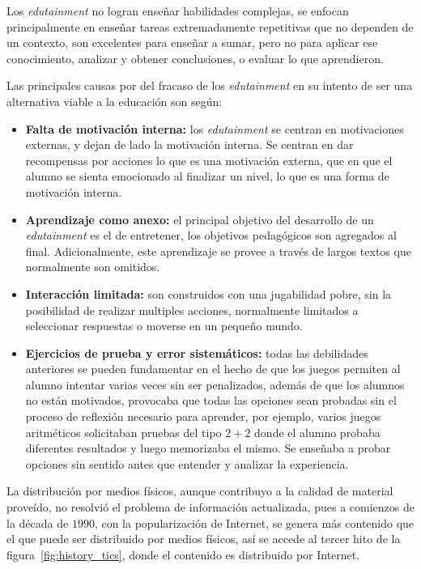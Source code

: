 Los \emph{edutainment} no logran enseñar habilidades complejas, se enfocan
principalmente en enseñar tareas extremadamente repetitivas que no dependen de
un contexto\cite{charsky:2010,egenfeldt2007third,bruckman1999can}, son
excelentes para enseñar a sumar, pero no para aplicar ese conocimiento, analizar
y obtener conclusiones, o evaluar lo que aprendieron.

Las principales causas por del fracaso de los \emph{edutainment} en su intento
de ser una alternativa viable a la educación son según\cite{egenfeldt2007third}: 

\begin{itemize}

\item \textbf{Falta de motivación interna:} los \emph{edutainment} se centran en
    motivaciones externas, y dejan de lado la motivación interna. Se centran en
    dar recompensas por acciones lo que es una motivación externa, que en que el
    alumno se sienta emocionado al finalizar un nivel, lo que es una forma de
    motivación interna.

\item \textbf{Aprendizaje como anexo:} el principal objetivo del desarrollo de un
    \emph{edutainment} es el de entretener, los objetivos pedagógicos son
    agregados al final. Adicionalmente, este aprendizaje se provee a través de
    largos textos que normalmente son omitidos.

\item \textbf{Interacción limitada:} son construidos con una jugabilidad pobre,
    sin la posibilidad de realizar multiples acciones, normalmente limitados a
    seleccionar respuestas o moverse en un pequeño mundo. 

\item \textbf{Ejercicios de prueba y error sistemáticos:} todas las debilidades
    anteriores se pueden fundamentar en el hecho de que los juegos permiten al
    alumno intentar varias veces sin ser penalizados, además
    de que los alumnos no están motivados, provocaba que todas las opciones sean
    probadas sin el proceso de reflexión necesario para aprender, por ejemplo,
    varios juegos aritméticos solicitaban pruebas del tipo $2+2$ donde el alumno
    probaba diferentes resultados y luego memorizaba el mismo. Se enseñaba a
    probar opciones sin sentido antes que entender y analizar la experiencia.

\end{itemize}

La distribución por medios físicos, aunque contribuyo a la calidad de material
proveído, no resolvió el problema de información actualizada, pues a comienzos
de la década de $1990$, con la popularización de Internet, se genera más
contenido que el que puede ser distribuido por medios físicos, así se accede al
tercer hito de la figura~\ref{fig:history_tics}, donde el contenido es
distribuido por Internet.

